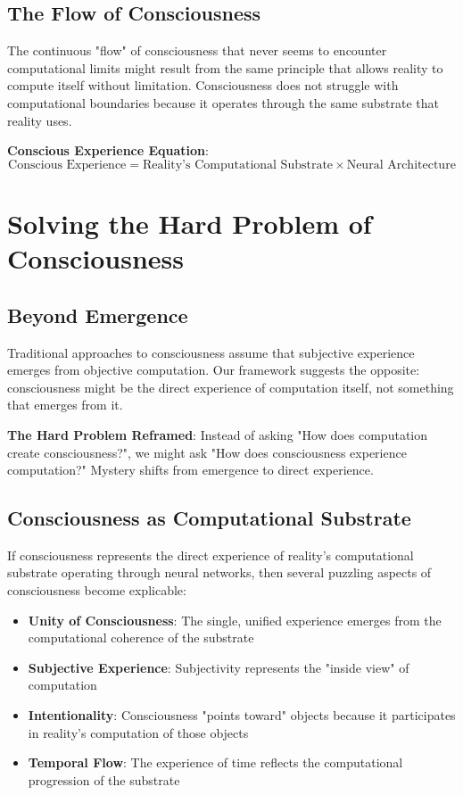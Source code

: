 \documentclass[12pt]{article}
\begin{document}
\subsection{The Flow of Consciousness}

The continuous "flow" of consciousness that never seems to encounter computational limits might result from the same principle that allows reality to compute itself without limitation. Consciousness does not struggle with computational boundaries because it operates through the same substrate that reality uses.

\textbf{Conscious Experience Equation}:
$$\text{Conscious Experience} = \text{Reality's Computational Substrate} \times \text{Neural Architecture}$$

\section{Solving the Hard Problem of Consciousness}

\subsection{Beyond Emergence}

Traditional approaches to consciousness assume that subjective experience emerges from objective computation. Our framework suggests the opposite: consciousness might be the direct experience of computation itself, not something that emerges from it.

\textbf{The Hard Problem Reframed}: Instead of asking "How does computation create consciousness?", we might ask "How does consciousness experience computation?" Mystery shifts from emergence to direct experience.

\subsection{Consciousness as Computational Substrate}

If consciousness represents the direct experience of reality's computational substrate operating through neural networks, then several puzzling aspects of consciousness become explicable:

\begin{itemize}
\item \textbf{Unity of Consciousness}: The single, unified experience emerges from the computational coherence of the substrate
\item \textbf{Subjective Experience}: Subjectivity represents the "inside view" of computation
\item \textbf{Intentionality}: Consciousness "points toward" objects because it participates in reality's computation of those objects
\item \textbf{Temporal Flow}: The experience of time reflects the computational progression of the substrate
\end{itemize}
\end{document}
